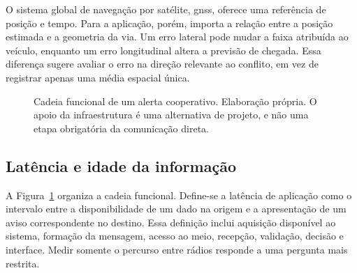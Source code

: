 \documentclass[conference,a4paper]{IEEEtran}
\begin{document}
O sistema global de navegação por satélite, \ac{gnss}, oferece uma referência de posição e tempo. Para a aplicação, porém, importa a relação entre a posição estimada e a geometria da via. Um erro lateral pode mudar a faixa atribuída ao veículo, enquanto um erro longitudinal altera a previsão de chegada. Essa diferença sugere avaliar o erro na direção relevante ao conflito, em vez de registrar apenas uma média espacial única.

\begin{figure}[t]
\centering
{}
\caption{Cadeia funcional de um alerta cooperativo. Elaboração própria. O apoio da infraestrutura é uma alternativa de projeto, e não uma etapa obrigatória da comunicação direta.}
\label{fig:cadeia}
\end{figure}

\subsection{Latência e idade da informação}
A Figura~\ref{fig:cadeia} organiza a cadeia funcional. Define-se a latência de aplicação como o intervalo entre a disponibilidade de um dado na origem e a apresentação de um aviso correspondente no destino. Essa definição inclui aquisição disponível ao sistema, formação da mensagem, acesso ao meio, recepção, validação, decisão e interface. Medir somente o percurso entre rádios responde a uma pergunta mais restrita.
\end{document}
